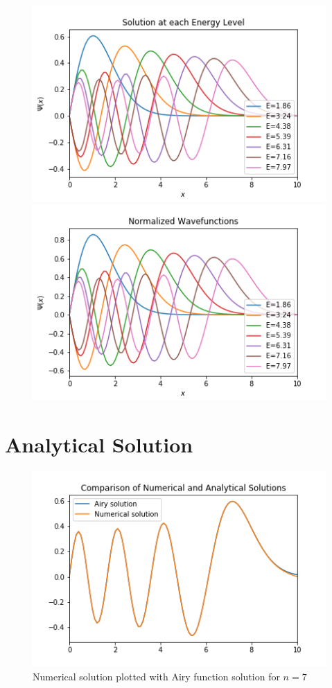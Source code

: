 \documentclass[12pt]{article}
\begin{document}
\begin{figure}[ht!]
	\centering
	\begin{minipage}[b]{0.4\textwidth}
		\includegraphics[scale=0.6]{../figures/wavefunctions.png}
	\end{minipage}
	\hfill
	\begin{minipage}[b]{-- 0.4\textwidth}
		\includegraphics[scale=0.6]{../figures/normalized.png}
	\end{minipage}
	\caption{}
	\label{psi}
\end{figure}

\section*{Analytical Solution}

\begin{figure}[ht!]
	\centering
	\includegraphics[scale=0.6]{../figures/airy_n=7.png}
	\caption{Numerical solution plotted with Airy function solution for $n=7$}
	\label{airy}
\end{figure}
\end{document}
